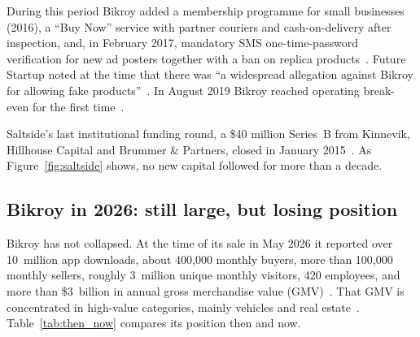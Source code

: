 \documentclass[11pt,a4paper]{article}
\begin{document}
During this period Bikroy added a membership programme for small businesses (2016), a
``Buy Now'' service with partner couriers and cash-on-delivery after inspection, and, in
February 2017, mandatory SMS one-time-password verification for new ad posters together
with a ban on replica products~\cite{wiki_bikroy,ds_buynow,fs_fraud}. Future Startup noted at the time
that there was ``a widespread allegation against Bikroy for allowing fake
products''~\cite{fs_fraud}. In August 2019 Bikroy reached operating break-even for the
first time~\cite{wiki_bikroy,fs_jiji}.

Saltside's last institutional funding round, a \$40 million Series~B from Kinnevik,
Hillhouse Capital and Brummer \& Partners, closed in January 2015~\cite{fs_jiji}. As
Figure~\ref{fig:saltside} shows, no new capital followed for more than a decade.

\subsection{Bikroy in 2026: still large, but losing position}
\label{sec:present}

Bikroy has not collapsed. At the time of its sale in May 2026 it reported over 10~million
app downloads, about 400{,}000 monthly buyers, more than 100{,}000 monthly sellers,
roughly 3~million unique monthly visitors, 420 employees, and more than \$3~billion in
annual gross merchandise value (GMV)~\cite{fs_jiji}. That GMV is concentrated in
high-value categories, mainly vehicles and real estate~\cite{fs_jiji}. Table~\ref{tab:then_now}
compares its position then and now.
\end{document}
